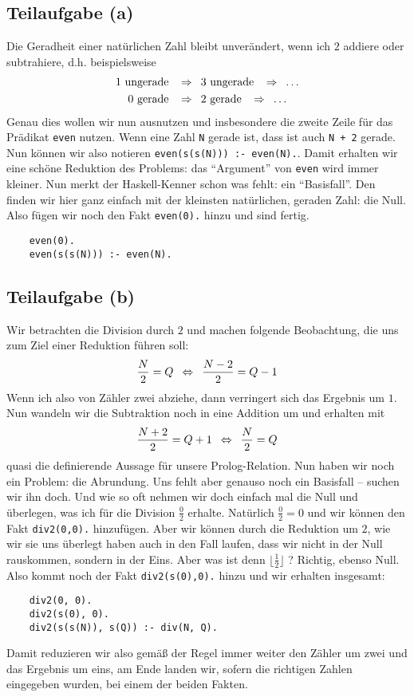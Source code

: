 \documentclass[ngerman, a4paper, 11pt]{article}
\theoremstyle{nonumberplain}
\begin{document}
\subsection*{Teilaufgabe (a)}

Die Geradheit einer natürlichen Zahl bleibt unverändert, wenn ich $2$ addiere oder subtrahiere, d.h. beispielsweise
\begin{align*}
	1 \text{ ungerade } &\enskip \Rightarrow \enskip 3 \text{ ungerade } \enskip \Rightarrow \enskip \dots \\
	0 \text{ gerade } &\enskip \Rightarrow \enskip 2 \text{ gerade } \enskip \Rightarrow \enskip \dots \\
\end{align*}
Genau dies wollen wir nun ausnutzen und insbesondere die zweite Zeile für das Prädikat \texttt{even} nutzen. Wenn eine Zahl \texttt{N} gerade ist, dass ist auch \texttt{N + 2} gerade. Nun können wir also notieren \texttt{even(s(s(N))) :- even(N).}. Damit erhalten wir eine schöne Reduktion des Problems: das \enquote{Argument} von \texttt{even} wird immer kleiner. Nun merkt der Haskell-Kenner schon was fehlt: ein \enquote{Basisfall}. Den finden wir hier ganz einfach mit der kleinsten natürlichen, geraden Zahl: die Null. Also fügen wir noch den Fakt \texttt{even(0).} hinzu und sind fertig.
\begin{lstlisting}
	even(0).
	even(s(s(N))) :- even(N).
\end{lstlisting}


\subsection*{Teilaufgabe (b)}

Wir betrachten die Division durch $2$ und machen folgende Beobachtung, die uns zum Ziel einer Reduktion führen soll:
\begin{equation*}
	\frac{N}{2} = Q \enskip \Leftrightarrow \enskip \frac{N-2}{2} = Q - 1
\end{equation*}
Wenn ich also von Zähler zwei abziehe, dann verringert sich das Ergebnis um $1$. Nun wandeln wir die Subtraktion noch in eine Addition um und erhalten mit
\begin{equation*}
	\frac{N+2}{2} = Q +1 \enskip \Leftrightarrow \enskip \frac{N}{2} = Q 
\end{equation*}
quasi die definierende Aussage für unsere Prolog-Relation.
Nun haben wir noch ein Problem: die Abrundung. Uns fehlt aber genauso noch ein Basisfall -- suchen wir ihn doch. Und wie so oft nehmen wir doch einfach mal die Null und überlegen, was ich für die Division $\frac 0 2$ erhalte. Natürlich $\frac 0 2 = 0$ und wir können den Fakt \texttt{div2(0,0).} hinzufügen. Aber wir können durch die Reduktion um $2$, wie wir sie uns überlegt haben auch in den Fall laufen, dass wir nicht in der Null rauskommen, sondern in der Eins. Aber was ist denn $\lfloor \frac 1 2 \rfloor$ ? Richtig, ebenso Null. Also kommt noch der Fakt \texttt{div2(s(0),0).} hinzu und wir erhalten insgesamt:
\begin{lstlisting}
	div2(0, 0).
	div2(s(0), 0). 
	div2(s(s(N)), s(Q)) :- div(N, Q).
\end{lstlisting}
Damit reduzieren wir also gemäß der Regel immer weiter den Zähler um zwei und das Ergebnis um eins, am Ende landen wir, sofern die richtigen Zahlen eingegeben wurden, bei einem der beiden Fakten. 
\end{document}
